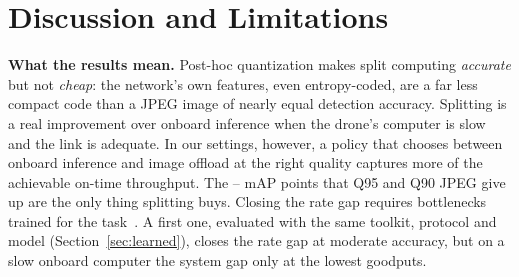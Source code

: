 \documentclass[journal,twocolumn,10pt]{IEEEtran}
\begin{document}
\section{Discussion and Limitations}
\textbf{What the results mean.} Post-hoc quantization makes split computing \emph{accurate} but not \emph{cheap}: the network's own features, even entropy-coded, are a far less compact code than a JPEG image of nearly equal detection accuracy. Splitting is a real improvement over onboard inference when the drone's computer is slow and the link is adequate. In our settings, however, a policy that chooses between onboard inference and image offload at the right quality captures more of the achievable on-time throughput. The \JPEGLossQNinetyFive--\JPEGLossQNinety{} mAP points that Q95 and Q90 JPEG give up are the only thing splitting buys. Closing the rate gap requires bottlenecks trained for the task~\cite{matsubara2023sc2,shao2020bottlenetpp}. A first one, evaluated with the same toolkit, protocol and model (Section~\ref{sec:learned}), closes the rate gap at moderate accuracy, but on a slow onboard computer the system gap only at the lowest goodputs.
\end{document}
